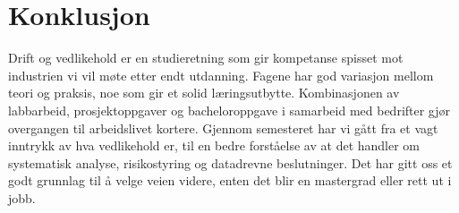 \section*{Konklusjon}
Drift og vedlikehold er en studieretning som gir kompetanse spisset mot industrien vi vil møte etter endt utdanning. Fagene har god variasjon mellom teori og praksis, noe som gir et solid læringsutbytte. Kombinasjonen av labbarbeid, prosjektoppgaver og bacheloroppgave i samarbeid med bedrifter gjør overgangen til arbeidslivet kortere. Gjennom semesteret har vi gått fra et vagt inntrykk av hva vedlikehold er, til en bedre forståelse av at det handler om systematisk analyse, risikostyring og datadrevne beslutninger. Det har gitt oss et godt grunnlag til å velge veien videre, enten det blir en mastergrad eller rett ut i jobb.
